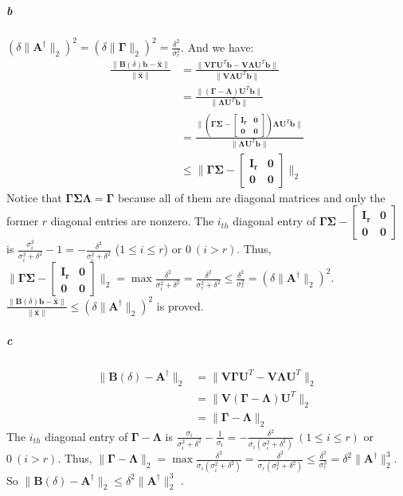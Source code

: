 \documentclass[22pt]{article}
\begin{document}
		\subparagraph{b} $(\delta\|\mathbf{A}^\dagger\|_2)^2 = (\delta\|\mathbf{\Gamma}\|_2)^2 = \frac{\delta^2}{\sigma_r^2}$. And we have:
		\begin{align}
			\frac{\|\mathbf{B}(\delta)\mathbf{b}-\hat{\mathbf{x}}\|}{\|\mathbf{\hat{x}}\|} & = \frac{\|\mathbf{V \Gamma U}^T\mathbf{b}-\mathbf{V \Lambda U}^T\mathbf{b}\|}{\|\mathbf{V \Lambda U}^T\mathbf{b}\|}\\
			& = \frac{\|\mathbf{(\Gamma- \Lambda)U}^T\mathbf{b}\|}{\|\mathbf{\Lambda U}^T\mathbf{b}\|}\\
			& = \frac{\|\mathbf{(\Gamma \Sigma- \left[\begin{array}{cc} \mathbf{I}_r & \mathbf{0}\\ \mathbf{0} & \mathbf{0} \end{array}\right])\Lambda}\mathbf{U}^T\mathbf{b}\|}{\|\mathbf{\Lambda U}^T\mathbf{b}\|}\\
			& \leq	\|\mathbf{\Gamma \Sigma- \left[\begin{array}{cc} \mathbf{I}_r & \mathbf{0}\\ \mathbf{0} & \mathbf{0} \end{array}\right]}\|_2
		\end{align}
		Notice that $\mathbf{\Gamma \Sigma \Lambda = \Gamma}$ because all of them are diagonal matrices and only the former $r$ diagonal entries are nonzero. The $i_{th}$ diagonal entry of $\mathbf{\Gamma \Sigma -\left[\begin{array}{cc} \mathbf{I}_r & \mathbf{0}\\ \mathbf{0} & \mathbf{0} \end{array}\right]}$ is $\frac{\sigma_i^2}{\sigma_i^2+\delta^2}-1 = -\frac{\delta^2}{\sigma_i^2+ \delta^2}$ ($1\leq i \leq r$) or $0\ (i>r)$. Thus, $\|\mathbf{\Gamma \Sigma- \left[\begin{array}{cc} \mathbf{I}_r & \mathbf{0}\\ \mathbf{0} & \mathbf{0} \end{array}\right]}\|_2 = \max \frac{\delta^2}{\sigma_i^2+ \delta^2} = \frac{\delta^2}{\sigma_r^2+ \delta^2} \leq \frac{\delta^2}{\sigma_r^2} = (\delta\|\mathbf{A}^\dagger\|_2)^2 $. $\frac{\|\mathbf{B}(\delta)\mathbf{b}-\hat{\mathbf{x}}\|}{\|\mathbf{\hat{x}}\|} \leq (\delta\|\mathbf{A}^\dagger\|_2)^2$ is proved.

		\subparagraph{c} \begin{align}
			\|\mathbf{B}(\delta)-\mathbf{A}^\dagger\|_2 & =\|\mathbf{V \Gamma U}^T-\mathbf{V \Lambda U}^T\|_2\\
			& = \|\mathbf{V(\Gamma- \Lambda)U}^T\|_2\\
			& = \|\mathbf{\Gamma -\Lambda}\|_2
		\end{align}
		The $i_{th}$ diagonal entry of $\mathbf{\Gamma- \Lambda}$ is $\frac{\sigma_i}{\sigma_i^2+\delta^2} - \frac{1}{\sigma_i} = -\frac{\delta^2}{\sigma_i(\sigma_i^2+\delta^2)} \ (1\leq i \leq r)$ or $0\ (i>r)$. Thus, $\|\mathbf{\Gamma - \Lambda}\|_2 = \max \frac{\delta^2}{\sigma_i(\sigma_i^2+\delta^2)} = \frac{\delta^2}{\sigma_r(\sigma_r^2+\delta^2)} \leq \frac{\delta^2}{\sigma_r^3} =\delta^2\|\mathbf{A}^\dagger\|_2^3$. So $\|\mathbf{B}(\delta)-\mathbf{A}^\dagger\|_2 \leq \delta^2\|\mathbf{A}^\dagger\|_2^3 $ .
\end{document}
